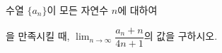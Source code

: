 수열 $\{a_n\}$이 모든 자연수 $n$에 대하여 \par\smallskip{}\par\smallskip\noindent 을 만족시킬 때, $\displaystyle\lim_{n\to\infty}\dfrac{a_n+n}{4n+1}$의 값을 구하시오.
